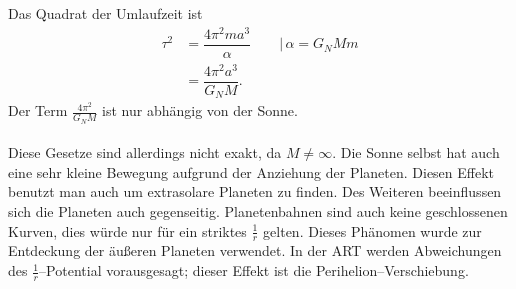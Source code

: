 \documentclass[a4paper,12pt]{article}
\numberwithin{equation}{section}
\begin{document}
Das Quadrat der Umlaufzeit ist
\begin{align*}
        \tau ^2&=\dfrac{4\pi ^2ma^3}{\alpha }\qquad |\, \alpha =G_NMm\\
               &=\dfrac{4\pi ^2a^3}{G_NM}
.\end{align*}
Der Term $\tfrac{4\pi ^2}{G_NM}$ ist nur abhängig von der Sonne.\\\\\indent
Diese Gesetze sind allerdings nicht exakt, da $M\neq \infty$. Die Sonne selbst hat auch eine sehr kleine Bewegung aufgrund der Anziehung der Planeten. Diesen Effekt benutzt man auch um extrasolare Planeten zu finden. Des Weiteren beeinflussen sich die Planeten auch gegenseitig. Planetenbahnen sind auch keine geschlossenen Kurven, dies würde nur für ein striktes $\tfrac{1}{r}$ gelten. Dieses Phänomen wurde zur Entdeckung der \glqq äußeren\grqq{} Planeten verwendet. In der ART werden Abweichungen des $\tfrac{1}{r}$--Potential vorausgesagt; dieser Effekt ist die Perihelion--Verschiebung.
\end{document}
